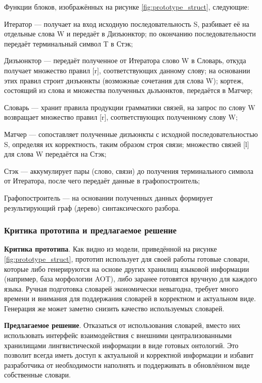 Функции блоков, изображённых на рисунке \ref{fig:prototype_struct}, следующие:
\begin{list}{}{\leftmargin=1.5cm}
	\item Итератор --- получает на вход исходную последовательность S, разбивает её на отдельные слова W и передаёт в Дизъюнктор; по окончанию последовательности передаёт терминальный символ T в Стэк;
	\item Дизъюнктор --- передаёт полученное от Итератора слово W в Словарь, откуда получает множество правил [r], соответствующих данному слову; на основании этих правил строит дизъюнкты (возможные сочетания для слова W); кортеж, состоящий из слова и множества полученных дьзъюнктов, передаётся в Матчер;
	\item Словарь --- хранит правила продукции грамматики связей, на запрос по слову W возвращает множество правил [r], соответствующих полученному слову W;
	\item Матчер --- сопоставляет полученные дизъюнкты с исходной последовательностью S, определяя их корректность, таким образом строя связи; множество связей [l] для слова W передаётся на Стэк;
	\item Стэк --- аккумулирует пары (слово, связи) до получения терминального символа от Итератора, после чего передаёт данные в графопостроитель;
	\item Графопостроитель --- на основании полученных данных формирует результирующий граф (дерево) синтаксического разбора.
\end{list}

\subsubsection{Критика прототипа и предлагаемое решение}

\textbf{Критика прототипа}. Как видно из модели, приведённой на рисунке \ref{fig:prototype_struct}, прототип использует для своей работы готовые словари, которые либо  генерируются на основе других хранилищ языковой информации (например, база морфологии AOT), либо заранее готовятся вручную для каждого языка. Ручная подготовка словарей экономически невыгодна, требует много времени и внимания для поддержания словарей в корректном и актуальном виде. Генерация же может заметно снизить качество используемых словарей.

\textbf{Предлагаемое решение}. Отказаться от использования словарей, вместо них использовать интерфейс взаимодействия с внешними централизованными хранилищами лингвистической информации в виде готовых онтологий. Это позволит всегда иметь доступ к актуальной и корректной информации и избавит разработчика от необходимости наполнять и поддерживать в обновлённом виде собственные словари.

